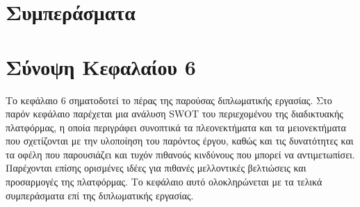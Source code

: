 \section{Συμπεράσματα}


\section{Σύνοψη Κεφαλαίου 6}
Το κεφάλαιο 6 σηματοδοτεί το πέρας της παρούσας διπλωματικής εργασίας. Στο παρόν κεφάλαιο παρέχεται μια ανάλυση SWOT του περιεχομένου της διαδικτυακής πλατφόρμας, η οποία περιγράφει συνοπτικά τα πλεονεκτήματα και τα μειονεκτήματα που σχετίζονται με την υλοποίηση του παρόντος έργου, καθώς και τις δυνατότητες και τα οφέλη που παρουσιάζει και τυχόν πιθανούς κινδύνους που μπορεί να αντιμετωπίσει. Παρέχονται επίσης ορισμένες ιδέες για πιθανές μελλοντικές βελτιώσεις και προσαρμογές της πλατφόρμας. Το κεφάλαιο αυτό ολοκληρώνεται με τα τελικά συμπεράσματα επί της διπλωματικής εργασίας.
